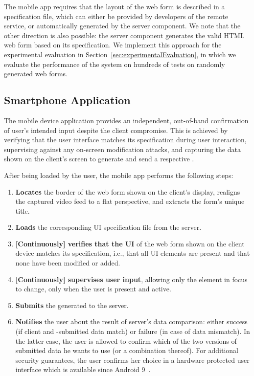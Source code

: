 The mobile app requires that the layout of the web form is described in a specification file, which can either be provided by developers of the remote service, or automatically generated by the \sysname server component.
We note that the other direction is also possible: the server component generates the valid HTML web form based on its specification.
We implement this approach for the experimental evaluation in Section~\ref{sec:experimentalEvaluation}, in which we evaluate the performance of the system on hundreds of tests on randomly generated web forms.




\subsection{\sysname Smartphone Application} \label{sec:systemDesign:phone}

The mobile device application provides an independent, out-of-band confirmation of user's intended input despite the client compromise.
This is achieved by verifying that the user interface matches its specification during user interaction, supervising against any on-screen modification attacks, and capturing the data shown on the client's screen to generate and send a respective \POI.

After being loaded by the user, the \sysname mobile app performs the following steps:
\begin{enumerate}%
    \item \textbf{Locates} the border of the web form shown on the client's display, realigns the captured video feed to a flat perspective, and extracts the form's unique title.
    \item \textbf{Loads} the corresponding UI specification file from the server.
    \item \textbf{[Continuously] verifies that the UI} of the web form shown on the client device matches its specification, i.e., that all UI elements are present and that none have been modified or added.
    \item \textbf{[Continuously] supervises user input}, allowing only the element in focus to change, only when the user is present and active.
	\item \textbf{Submits} the generated \POI to the server.
    \item \textbf{Notifies} the user about the result of server's data comparison: either success (if client and \md -submitted data match) or failure (in case of data mismatch).
    In the latter case, the user is allowed to confirm which of the two versions of submitted data he wants to use (or a combination thereof).
    For additional security guarantees, the user confirms her choice in a hardware protected user interface which is available since Android 9~\cite{androidConfirmation}.
\end{enumerate}

